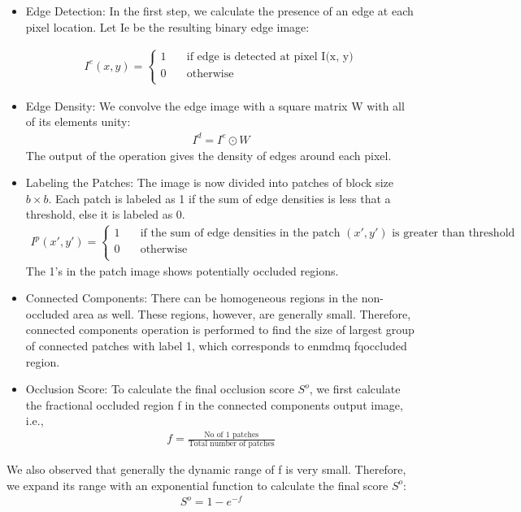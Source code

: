 \documentclass{sig-alternate-05-2015}
\begin{document}
\begin{itemize}
\item Edge Detection: In the first step, we calculate the presence of
an edge at each pixel location. Let Ie be the resulting binary
edge image:

\begin{eqnarray}
I^e(x,y)=
\begin{cases}
	1 &\quad\text{if edge is detected at pixel I(x, y)}\\
	0 &\quad\text{otherwise}\\
\end{cases}
\end{eqnarray}

\item Edge Density: We convolve the edge image with a square
matrix W with all of its elements unity:
\begin{eqnarray}
I^d = I^e\odot W
\end{eqnarray}
The output of the operation gives the density of edges around
each pixel.
\item Labeling the Patches: The image is now divided into patches
of block size $b\times b$. Each patch is labeled as 1 if the sum of
edge densities is less that a threshold, else it is labeled as 0.
\begin{eqnarray}
I^p(x',y')=
\begin{cases}
	1 &\quad\text{if the sum of edge densities in the
patch $(x',y')$ is greater than threshold}\\
	0 &\quad\text{otherwise}\\
\end{cases}
\end{eqnarray}
The 1's in the patch image shows potentially occluded regions.
\item Connected Components: There can be homogeneous regions
in the non-occluded area as well. These regions, however, are
generally small. Therefore, connected components operation
is performed to find the size of largest group of connected
patches with label 1, which corresponds to enmdmq fqoccluded region.
\item Occlusion Score: To calculate the final occlusion score $S^o$,
we first calculate the fractional occluded region f in the connected
components output image, i.e.,
\begin{eqnarray}
f=\frac{\text{No of 1 patches}}{\text{Total number of patches}}
\end{eqnarray}
\end{itemize}
We also observed that generally the dynamic range of f is very
small. Therefore, we expand its range with an exponential function
to calculate the final score $S^o$:
\begin{eqnarray}
S^o = 1- e^{-f}
\end{eqnarray}
\end{document}
